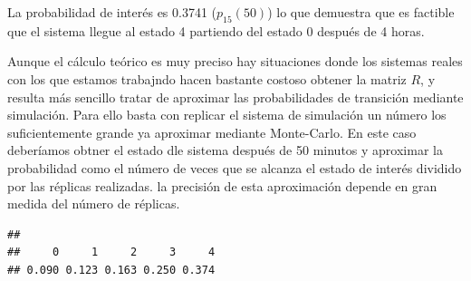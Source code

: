 \documentclass[
]{book}
\newenvironment{Shaded}{\begin{snugshade}}{\end{snugshade}}
\newcommand{\AttributeTok}[1]{\textcolor[rgb]{0.77,0.63,0.00}{#1}}
\newcommand{\CommentTok}[1]{\textcolor[rgb]{0.56,0.35,0.01}{\textit{#1}}}
\newcommand{\ControlFlowTok}[1]{\textcolor[rgb]{0.13,0.29,0.53}{\textbf{#1}}}
\newcommand{\DecValTok}[1]{\textcolor[rgb]{0.00,0.00,0.81}{#1}}
\newcommand{\FunctionTok}[1]{\textcolor[rgb]{0.00,0.00,0.00}{#1}}
\newcommand{\NormalTok}[1]{#1}
\newcommand{\OtherTok}[1]{\textcolor[rgb]{0.56,0.35,0.01}{#1}}
\newcommand{\SpecialCharTok}[1]{\textcolor[rgb]{0.00,0.00,0.00}{#1}}
\theoremstyle{definition}
\theoremstyle{definition}
\theoremstyle{definition}
\theoremstyle{definition}
\theoremstyle{remark}
\begin{document}
La probabilidad de interés es 0.3741 (\(p_{15}(50)\)) lo que demuestra que es factible que el sistema llegue al estado 4 partiendo del estado 0 después de 4 horas.

Aunque el cálculo teórico es muy preciso hay situaciones donde los sistemas reales con los que estamos trabajndo hacen bastante costoso obtener la matriz \(R\), y resulta más sencillo tratar de aproximar las probabilidades de transición mediante simulación. Para ello basta con replicar el sistema de simulación un número los suficientemente grande ya aproximar mediante Monte-Carlo. En este caso deberíamos obtner el estado dle sistema después de 50 minutos y aproximar la probabilidad como el número de veces que se alcanza el estado de interés dividido por las réplicas realizadas. la precisión de esta aproximación depende en gran medida del número de réplicas.

\begin{Shaded}
\end{Shaded}

\begin{verbatim}
## 
##     0     1     2     3     4 
## 0.090 0.123 0.163 0.250 0.374
\end{verbatim}
\end{document}
